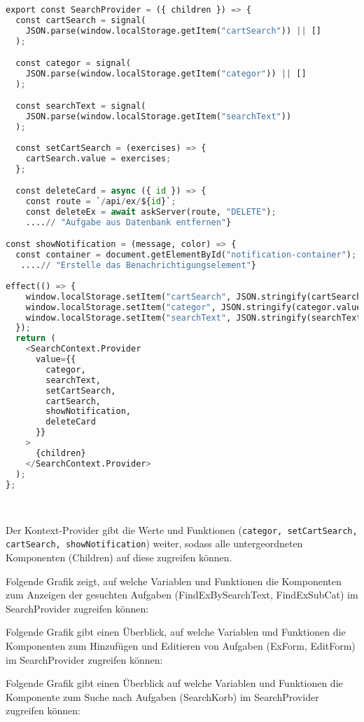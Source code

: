 \begin{lstlisting}[language=Python]
export const SearchProvider = ({ children }) => {
  const cartSearch = signal(
    JSON.parse(window.localStorage.getItem("cartSearch")) || []
  );

  const categor = signal(
    JSON.parse(window.localStorage.getItem("categor")) || []
  );

  const searchText = signal(
    JSON.parse(window.localStorage.getItem("searchText"))
  );
  
  const setCartSearch = (exercises) => {
    cartSearch.value = exercises;
  };

  const deleteCard = async ({ id }) => {
    const route = `/api/ex/${id}`;
    const deleteEx = await askServer(route, "DELETE");
    ....// "Aufgabe aus Datenbank entfernen"}

const showNotification = (message, color) => {
  const container = document.getElementById("notification-container");
   ....// "Erstelle das Benachrichtigungselement"}
   
effect(() => {
    window.localStorage.setItem("cartSearch", JSON.stringify(cartSearch.value));
    window.localStorage.setItem("categor", JSON.stringify(categor.value));
    window.localStorage.setItem("searchText", JSON.stringify(searchText.value));
  });
  return (
    <SearchContext.Provider
      value={{
        categor,
        searchText,
        setCartSearch,
        cartSearch,
        showNotification,
        deleteCard
      }}
    >
      {children}
    </SearchContext.Provider>
  );
};




 \end{lstlisting}  
Der Kontext-Provider gibt die Werte und Funktionen (\texttt{categor, setCartSearch, cartSearch, showNotification}) weiter, sodass alle untergeordneten Komponenten (Children) auf diese zugreifen können.

Folgende Grafik zeigt, auf welche Variablen und Funktionen die Komponenten zum Anzeigen der gesuchten Aufgaben (FindExBySearchText, FindExSubCat) im SearchProvider zugreifen können:

Folgende Grafik gibt einen Überblick, auf welche Variablen und Funktionen die Komponenten zum Hinzufügen und Editieren von Aufgaben (ExForm, EditForm) im SearchProvider zugreifen können:

Folgende Grafik gibt einen Überblick auf welche Variablen und Funktionen die Komponente zum Suche nach Aufgaben (SearchKorb) im SearchProvider zugreifen können:


